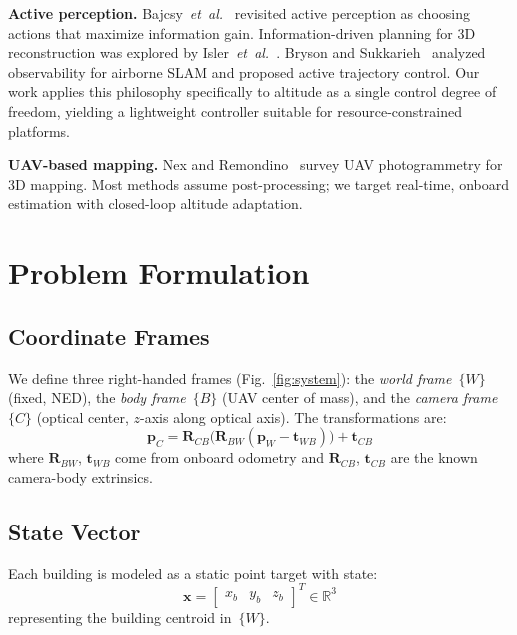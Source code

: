 \documentclass[journal]{IEEEtran}
\newcommand{\vx}{\mathbf{x}}
\newcommand{\vR}{\mathbf{R}}
\begin{document}
\textbf{Active perception.}
Bajcsy~\emph{et~al.}~\cite{bajcsy2018revisiting} revisited active perception as choosing actions that maximize information gain.
Information-driven planning for 3D reconstruction was explored by Isler~\emph{et~al.}~\cite{isler2016information}.
Bryson and Sukkarieh~\cite{bryson2008observability} analyzed observability for airborne SLAM and proposed active trajectory control.
Our work applies this philosophy specifically to altitude as a single control degree of freedom, yielding a lightweight controller suitable for resource-constrained platforms.

\textbf{UAV-based mapping.}
Nex and Remondino~\cite{nex2014uav} survey UAV photogrammetry for 3D mapping.
Most methods assume post-processing; we target real-time, onboard estimation with closed-loop altitude adaptation.

\section{Problem Formulation}

\subsection{Coordinate Frames}
We define three right-handed frames (Fig.~\ref{fig:system}):
the \emph{world frame}~$\{W\}$ (fixed, NED),
the \emph{body frame}~$\{B\}$ (UAV center of mass), and
the \emph{camera frame}~$\{C\}$ (optical center, $z$-axis along optical axis).
The transformations are:
\begin{equation}
    \mathbf{p}_C = \vR_{CB}\bigl(\vR_{BW}(\mathbf{p}_W - \mathbf{t}_{WB})\bigr) + \mathbf{t}_{CB}
\end{equation}
where $\vR_{BW}$, $\mathbf{t}_{WB}$ come from onboard odometry and $\vR_{CB}$, $\mathbf{t}_{CB}$ are the known camera-body extrinsics.

\subsection{State Vector}
Each building is modeled as a static point target with state:
\begin{equation}
    \vx = \begin{bmatrix} x_b & y_b & z_b \end{bmatrix}^T \in \mathbb{R}^3
\end{equation}
representing the building centroid in~$\{W\}$.
\end{document}

